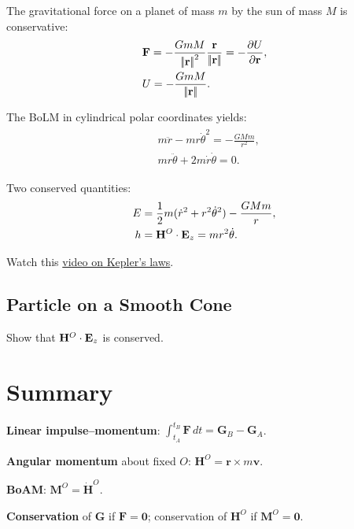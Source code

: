 \documentclass[
  letterpaper,
  DIV=11,
  numbers=noendperiod]{scrreprt}
\newcommand{\lnorm}{\left|\!\left|}
\newcommand{\rnorm}{\right|\!\right|}
\begin{document}
The gravitational force on a planet of mass \(m\) by the sun of mass
\(M\) is conservative: \begin{align}
    \begin{split}
        & {\bf F} = -\frac{GmM}{\lnorm{\bf r}\rnorm^2}\frac{\bf r}{\lnorm{\bf r}\rnorm} = -\frac{\partial U}{\partial {\bf r}},\\
        & U = -\frac{GmM}{\lnorm{\bf r}\rnorm}.
    \end{split}
\end{align}

The BoLM in cylindrical polar coordinates yields: \begin{align}
    \begin{split}
        & m\ddot{r}-mr\dot{\theta}^2 = -\frac{GMm}{r^2},\\
        & mr\ddot{\theta}+2m\dot{r}\dot{\theta} = 0.
    \end{split}
\end{align}

Two conserved quantities: \begin{align}
    E &= \frac{1}{2}m(\dot{r}^2+r^2\dot{\theta}^2)-\frac{GMm}{r},\\
    h &= {\bf H}^O\cdot{\bf E}_z = mr^2\dot{\theta}.
\end{align}

Watch this \href{https://www.youtube.com/watch?v=pdst6HQkdrc}{video on
Kepler's laws}.

\subsection{Particle on a Smooth Cone}\label{particle-on-a-smooth-cone}

Show that \({\bf H}^O\cdot{\bf E}_z\) is conserved.

\section{Summary}\label{summary-9}

\textbf{Linear impulse--momentum}:
\(\int_{t_A}^{t_B}\mathbf{F}\,dt = \mathbf{G}_B - \mathbf{G}_A\).

\textbf{Angular momentum} about fixed \(O\):
\(\mathbf{H}^O = \mathbf{r}\times m\mathbf{v}\).

\textbf{BoAM}: \(\mathbf{M}^O = \dot{\mathbf{H}}^O\).

\textbf{Conservation} of \(\mathbf{G}\) if \(\mathbf{F}=\mathbf{0}\);
conservation of \(\mathbf{H}^O\) if \(\mathbf{M}^O=\mathbf{0}\).
\end{document}
